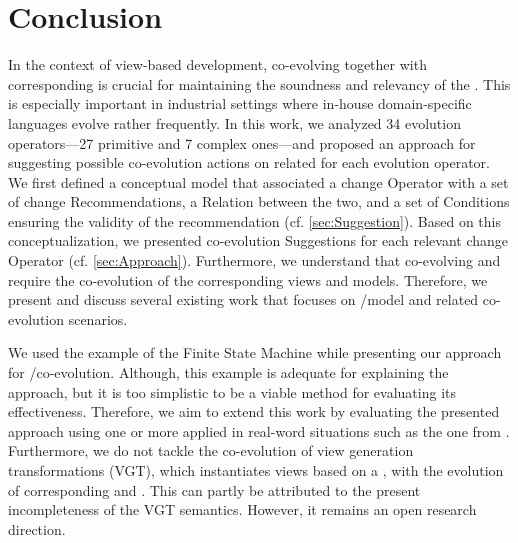 \section{Conclusion} \label{sec:Conclusion}

In the context of view-based development, co-evolving \viewtypes together with corresponding \metamodels is crucial for maintaining the soundness and relevancy of the \viewtypes. This is especially important in industrial settings where in-house domain-specific languages evolve rather frequently. In this work, we 
analyzed 34 \metamodel evolution operators---27 primitive and 7 complex ones---and proposed an approach for suggesting possible co-evolution actions on related \viewtypes for each \metamodel evolution operator. We first defined a conceptual model that associated a \metamodel change \textsf{Operator} with a set of \viewtype change \textsf{Recommendation}s, a \textsf{Relation} between the two, and a set of \textsf{Conditions}
ensuring the validity of the recommendation (cf. \cref{sec:Suggestion}). Based on this conceptualization, we presented \viewtype co-evolution \textsf{Suggestion}s for each relevant \metamodel change \textsf{Operator} (cf. \cref{sec:Approach}). Furthermore, we understand that co-evolving \viewtypes and \metamodels require the co-evolution of the corresponding views and models. Therefore, we present and discuss several existing work that focuses on \metamodel/model and related co-evolution scenarios. 

We used the example of the Finite State Machine while presenting our approach for \viewtype/\metamodel co-evolution. Although, this example is adequate for explaining the approach, but it is too simplistic to be a viable method for evaluating its effectiveness.
Therefore, we aim to extend this work by evaluating the presented approach using one or more \metamodels applied in real-word situations such as the one from \textcite{braun_classification_2014}. Furthermore, we do not tackle the co-evolution of view generation transformations (VGT), which instantiates views based on a \viewtype, with the evolution of corresponding \viewtypes and \metamodels. This can partly be attributed to the present incompleteness of the VGT semantics. However, it remains an open research direction. 

